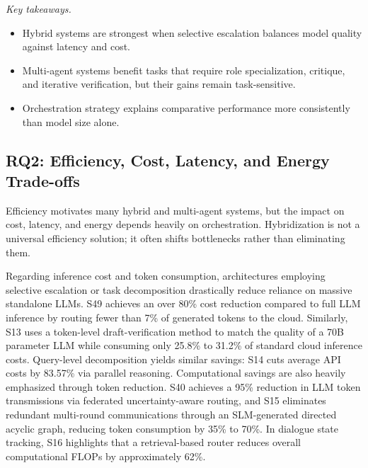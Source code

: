 \begin{samepage}
\smallskip\noindent\textit{Key takeaways.}
\begin{itemize}
    \item Hybrid systems are strongest when selective escalation balances model quality against latency and cost.
    \item Multi-agent systems benefit tasks that require role specialization, critique, and iterative verification, but their gains remain task-sensitive.
    \item Orchestration strategy explains comparative performance more consistently than model size alone.
\end{itemize}
\end{samepage}

\subsection{RQ2: Efficiency, Cost, Latency, and Energy Trade-offs}
\label{sec:rq2}

Efficiency motivates many hybrid and multi-agent systems, but the impact on cost, latency, and energy depends heavily on orchestration. Hybridization is not a universal efficiency solution; it often shifts bottlenecks rather than eliminating them.

Regarding inference cost and token consumption, architectures employing selective escalation or task decomposition drastically reduce reliance on massive standalone LLMs. S49 achieves an over 80\% cost reduction compared to full LLM inference by routing fewer than 7\% of generated tokens to the cloud. Similarly, S13 uses a token-level draft-verification method to match the quality of a 70B parameter LLM while consuming only 25.8\% to 31.2\% of standard cloud inference costs. Query-level decomposition yields similar savings: S14 cuts average API costs by 83.57\% via parallel reasoning. Computational savings are also heavily emphasized through token reduction. S40 achieves a 95\% reduction in LLM token transmissions via federated uncertainty-aware routing, and S15 eliminates redundant multi-round communications through an SLM-generated directed acyclic graph, reducing token consumption by 35\% to 70\%. In dialogue state tracking, S16 highlights that a retrieval-based router reduces overall computational FLOPs by approximately 62\%.

